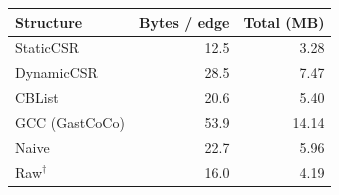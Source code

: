 \begin{tabular}{lrr}
\toprule
Structure & Bytes / edge & Total (MB) \\
\midrule
StaticCSR & 12.5 & 3.28 \\
DynamicCSR & 28.5 & 7.47 \\
CBList & 20.6 & 5.40 \\
GCC (GastCoCo) & 53.9 & 14.14 \\
Naive & 22.7 & 5.96 \\
Raw$^\dagger$ & 16.0 & 4.19 \\
\bottomrule
\end{tabular}
